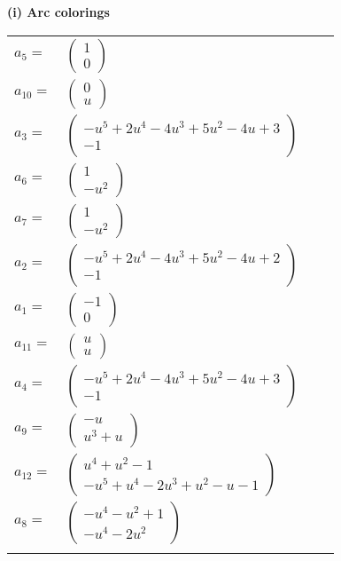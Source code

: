 \documentclass[1p]{elsarticle_modified}
\theoremstyle{definition}
\begin{document}
\flushleft \textbf{(i) Arc colorings}\\
\begin{tabular}{m{7pt} m{180pt} m{7pt} m{180pt} }
\flushright $a_{5}=$&$\begin{pmatrix}1\\0\end{pmatrix}$ \\
\flushright $a_{10}=$&$\begin{pmatrix}0\\u\end{pmatrix}$ \\
\flushright $a_{3}=$&$\begin{pmatrix}- u^5+2 u^4-4 u^3+5 u^2-4 u+3\\-1\end{pmatrix}$ \\
\flushright $a_{6}=$&$\begin{pmatrix}1\\- u^2\end{pmatrix}$ \\
\flushright $a_{7}=$&$\begin{pmatrix}1\\- u^2\end{pmatrix}$ \\
\flushright $a_{2}=$&$\begin{pmatrix}- u^5+2 u^4-4 u^3+5 u^2-4 u+2\\-1\end{pmatrix}$ \\
\flushright $a_{1}=$&$\begin{pmatrix}-1\\0\end{pmatrix}$ \\
\flushright $a_{11}=$&$\begin{pmatrix}u\\u\end{pmatrix}$ \\
\flushright $a_{4}=$&$\begin{pmatrix}- u^5+2 u^4-4 u^3+5 u^2-4 u+3\\-1\end{pmatrix}$ \\
\flushright $a_{9}=$&$\begin{pmatrix}- u\\u^3+u\end{pmatrix}$ \\
\flushright $a_{12}=$&$\begin{pmatrix}u^4+u^2-1\\- u^5+u^4-2 u^3+u^2- u-1\end{pmatrix}$ \\
\flushright $a_{8}=$&$\begin{pmatrix}- u^4- u^2+1\\- u^4-2 u^2\end{pmatrix}$\\&\end{tabular}
\end{document}
